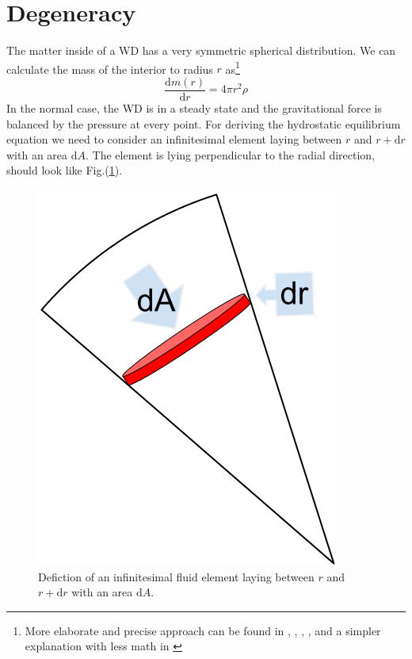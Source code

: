 \documentclass[oneside,a4paper,11pt]{report}
\begin{document}
\section{Degeneracy}
The matter inside of a WD has a very symmetric spherical distribution. We can calculate the mass of the interior to radius $r$ as\footnote{More elaborate and precise approach can be found in
\citet{2004bhwd.book.....S}, \cite{padm_vII}, \citet{kleczek}, \citet{comp_obj1}, \citet{1972ApJ...175..417N} and a simpler explanation with
less math in \citet{2007ima..book.....C}}
\begin{equation}
 \frac{\mathrm{d}m(r)}{\mathrm{d}r} = 4 \pi r^2 \rho
\end{equation}
In the normal case, the WD is in a steady state and the gravitational force is balanced by the pressure at every point.  
For deriving the hydrostatic equilibrium equation we need to consider an infinitesimal element laying between 
$r$ and $r+\mathrm{d}r$ with an area $\mathrm{d}A$. The element is lying perpendicular to the radial direction, should look like Fig.(\ref{wd1}).
\begin{figure}[!hbt]
\centering
\includegraphics[totalheight=4cm]{plot/wd1}
\caption{Defiction of an infinitesimal fluid element laying between 
$r$ and $r+\mathrm{d}r$ with an area $\mathrm{d}A$.}
\label{wd1} 
\end{figure}
\end{document}
